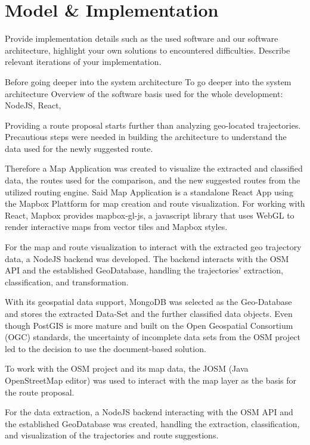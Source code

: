 \section{Model & Implementation}

Provide implementation details such as the used software and our software architecture, highlight your own solutions to encountered difficulties. Describe relevant iterations of your implementation.

Before going deeper into the system architecture 
To go deeper into the system architecture 
Overview of the software basis used for the whole development: 
NodeJS, React,


Providing a route proposal starts further than analyzing geo-located trajectories. Precautious steps were needed in building the architecture to understand the data used for the newly suggested route. 

Therefore a Map Application was created to visualize the extracted and classified data, the routes used for the comparison, and the new suggested routes from the utilized routing engine. Said Map Application is a standalone React App using the Mapbox Plattform for map creation and route visualization. For working with React, Mapbox provides mapbox-gl-js, a javascript library that uses WebGL to render interactive maps from vector tiles and Mapbox styles.


For the map and route visualization to interact with the extracted geo trajectory data, a NodeJS backend was developed. The backend interacts with the OSM API and the established GeoDatabase, handling the trajectories' extraction, classification, and transformation.

With its geospatial data support, MongoDB was selected as the Geo-Database and stores the extracted Data-Set and the further classified data objects. Even though PostGIS is more mature and built on the Open Geospatial Consortium (OGC) standards, the uncertainty of incomplete data sets from the OSM project led to the decision to use the document-based solution.

To work with the OSM project and its map data, the JOSM (Java OpenStreetMap editor) was used to interact with the map layer as the basis for the route proposal. 

For the data extraction, a NodeJS backend interacting with the OSM API and the established GeoDatabase was created, handling the extraction, classification, and visualization of the trajectories and route suggestions.

